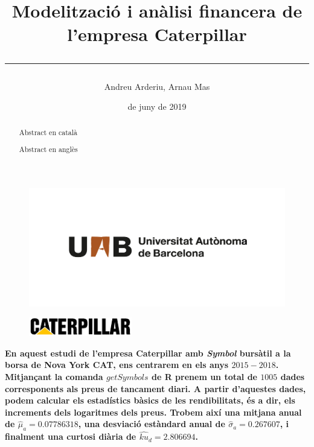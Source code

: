 \documentclass{article}
\title{\sffamily \bfseries Modelització i anàlisi financera de l'empresa Caterpillar \vspace{1em} \hrule}
\author{\sffamily Andreu Arderiu, Arnau Mas}
\date{\sffamily 14 de juny de 2019}
\numberwithin{table}{section}
\numberwithin{figure}{section}
\numberwithin{equation}{section}
\begin{document}
\begin{titlepage}
	\clearpage
	\thispagestyle{empty}
	\maketitle	

	\renewcommand{\abstractname}{\bfseries \sffamily Resum:}
	\begin{abstract}
		Abstract en català
	\end{abstract}

	\renewcommand{\abstractname}{\bfseries \sffamily Abstract:}
	\begin{abstract}
		Abstract en anglès
	\end{abstract}

	\begin{figure}[b]
		\thispagestyle{empty}
		\center \includegraphics[scale = 0.3]{uab}
	\end{figure}
\end{titlepage}

\begin{figure}[H]
	\centering \small \sffamily
	\includegraphics[width=0.4\textwidth]{cat-logo}
\end{figure}
\textbf{En aquest estudi de l'empresa Caterpillar amb \textit{Symbol} bursàtil a la borsa de Nova York CAT, ens centrarem en els anys $2015-2018$. Mitjançant la comanda $getSymbols$ de R prenem un total de $1005$ dades corresponents als preus de tancament diari. A partir d'aquestes dades, podem calcular els estadístics bàsics de les rendibilitats, és a dir, els increments dels logaritmes dels preus. Trobem així una mitjana anual de $\hat{\mu}_a=0.07786318$, una desviació estàndard anual de $\hat{\sigma}_a=0.267607$, i finalment una curtosi diària de $\hat{ku}_d=2.806694$. }
\end{document}
